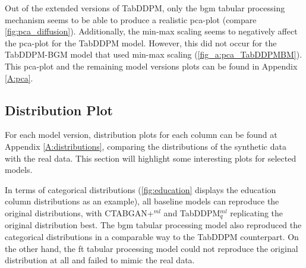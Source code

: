 Out of the extended versions of TabDDPM, only the \gls{bgm} tabular processing mechanism seems to be able to produce a realistic \gls{pca}-plot (compare \autoref{fig:pca_diffusion}).
Additionally, the min-max scaling seems to negatively affect the \gls{pca}-plot for the TabDDPM model.
However, this did not occur for the TabDDPM-BGM model that used min-max scaling (\autoref{fig_a:pca_TabDDPMBM}).
This \gls{pca}-plot and the remaining model versions plots can be found in Appendix \ref{A:pca}.

\subsection{Distribution Plot}
\label{ch:results-Distr}

For each model version, distribution plots for each column can be found at Appendix \ref{A:distributions}, comparing the distributions of the synthetic data with the real data.
This section will highlight some interesting plots for selected models.

In terms of categorical distributions (\autoref{fig:education} displays the education column distributions as an example), all baseline models can reproduce the original distributions,
with CTABGAN+$^{ml}$ and TabDDPM$^{ml}_q$ replicating the original distribution best.
The \gls{bgm} tabular processing model also reproduced the categorical distributions in a comparable way to the TabDDPM counterpart.
On the other hand, the \gls{ft} tabular processing model could not reproduce the original distribution at all and failed to mimic the real data.

